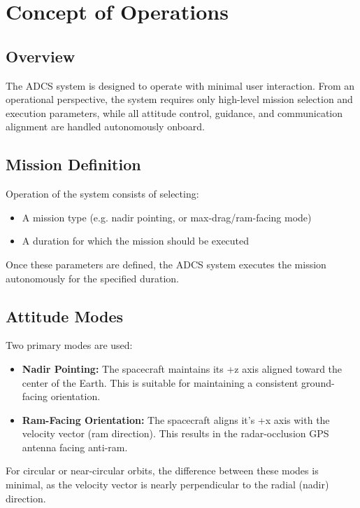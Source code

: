 \chapter{Concept of Operations}

\section{Overview}

The ADCS system is designed to operate with minimal user interaction. From an operational perspective, the system requires only high-level mission selection and execution parameters, while all attitude control, guidance, and communication alignment are handled autonomously onboard.

\section{Mission Definition}

Operation of the system consists of selecting:

\begin{itemize}
	\item A mission type (e.g. nadir pointing, or max-drag/ram-facing mode)
	\item A duration for which the mission should be executed
\end{itemize}

Once these parameters are defined, the ADCS system executes the mission autonomously for the specified duration.

\section{Attitude Modes}

Two primary modes are used:

\begin{itemize}
	\item \textbf{Nadir Pointing:} The spacecraft maintains its +z axis aligned toward the center of the Earth. This is suitable for maintaining a consistent ground-facing orientation.
	
	\item \textbf{Ram-Facing Orientation:} The spacecraft aligns it's +x axis with the velocity vector (ram direction). This results in the radar-occlusion GPS antenna facing anti-ram.
\end{itemize}

For circular or near-circular orbits, the difference between these modes is minimal, as the velocity vector is nearly perpendicular to the radial (nadir) direction.

